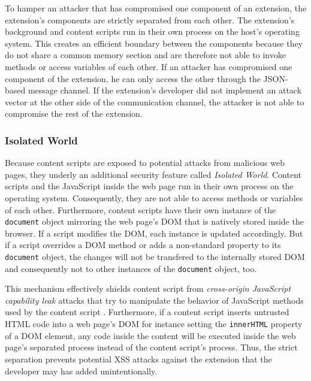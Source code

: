 	To hamper an attacker that has compromised one component of an extension, the extension's components are strictly separated from each other. The extension's background and content scripts run in their own process on the host's operating system. This creates an efficient boundary between the components because they do not share a common memory section and are therefore not able to invoke methods or access variables of each other. If an attacker has compromised one component of the extension, he can only access the other through the JSON-based message channel. If the extension's developer did not implement an attack vector at the other side of the communication channel, the attacker is not able to compromise the rest of the extension. 
	
\subsubsection{Isolated World}
	
	Because content scripts are exposed to potential attacks from malicious web pages, they underly an additional security feature called \textit{Isolated World}. Content scripts and the JavaScript inside the web page run in their own process on the operating system. Consequently, they are not able to access methods or variables of each other. Furthermore, content scripts have their own instance of the \texttt{document} object mirroring the web page's DOM that is natively stored inside the browser. If a script modifies the DOM, each instance is updated accordingly. But if a script overrides a DOM method or adds a non-standard property to its \texttt{document} object, the changes will not be transfered to the internally stored DOM and consequently not to other instances of the \texttt{document} object, too.	
	
	This mechanism effectively shields content script from \textit{cross-origin JavaScript capability leak} attacks that try to manipulate the behavior of JavaScript methods used by the content script \cite{Carlini:2012:EGC:2362793.2362800, Barth:2009:CJC:1855768.1855780}. Furthermore, if a content script inserts untrusted HTML code into a web page's DOM for instance setting the \texttt{innerHTML} property of a DOM element, any code inside the content will be executed inside the web page's separated process instead of the content script's process. Thus, the strict separation prevents potential XSS attacks against the extension that the developer may has added unintentionally.

